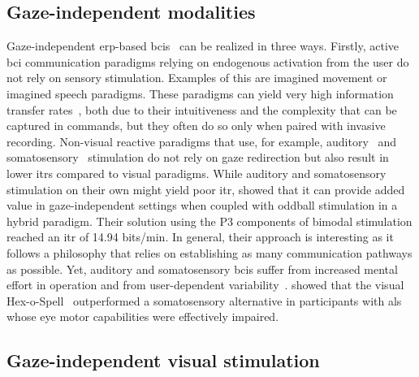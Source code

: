 \subsection{Gaze-independent modalities}
Gaze-independent \ac{erp}-based \acp{bci}~\cite{Riccio2012, Aloise2012} can be realized in three
ways.
Firstly, active \ac{bci} communication paradigms relying on endogenous activation from the user
do not rely on sensory stimulation.
Examples of this are imagined movement or imagined speech paradigms.
These paradigms can yield very high information transfer
rates~\cite{Willett2021,Metzger2023}, both due to their intuitiveness and the
complexity that can be captured in commands, but they often do so only when paired
with invasive recording.
Non-visual reactive paradigms that use, for example, auditory~\cite{Halder2010} and
somatosensory~\cite{Brouwer2010}
stimulation do not rely on gaze redirection but also result in lower \acp{itr}
compared to visual paradigms.
While auditory and somatosensory stimulation on their own might yield poor
\ac{itr}, \textcite{Yin2016} showed that it can provide added value in gaze-independent
settings when coupled with oddball stimulation in a hybrid paradigm.
Their solution using the P3 components of bimodal stimulation reached an \ac{itr} of 14.94 bits/min.
In general, their approach is interesting as it follows a philosophy that
relies on establishing as many communication pathways as possible.
Yet, auditory and somatosensory \acp{bci} suffer from increased mental effort in
operation and from user-dependent
variability~\cite{Severens2014,Reichert2020b}.
\textcite{Severens2014} showed that the visual Hex-o-Spell~\cite{Treder2010}
outperformed a somatosensory alternative in participants with \ac{als} whose
eye motor capabilities were effectively impaired.

\subsection{Gaze-independent visual stimulation}
\label{sec:gaze-independence/sota/visual}

